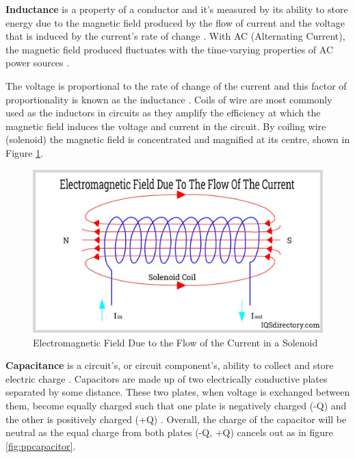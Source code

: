 \documentclass[12pt]{article}
\begin{document}
\textbf{Inductance} is a property of a conductor
\cite{britinductance}
and it's measured by its ability to store energy due to the magnetic field produced by the flow of current
\cite{elecnotes}
and the voltage that is induced by the current's rate of change
\cite{britinductance}.
With AC (Alternating Current), the magnetic field produced fluctuates with the time-varying properties of AC power sources
\cite{elecnotes,britinductance}.

The voltage is proportional to the rate of change of the current and this factor of proportionality is known as the inductance
\cite{britinductance}.
Coils of wire are most commonly used as the inductors in circuits as they amplify \cite{elecnotes} the efficiency at which the magnetic field induces
the voltage and current in the circuit. By coiling wire (solenoid) the magnetic field is concentrated and magnified at its centre, shown in Figure \ref{fig:solenoid}.

\begin{figure}[H]
    \includegraphics[width=12.5cm]{solenoid.jpg}
    \centering
    \caption{\centering \footnotesize{Electromagnetic Field Due to the Flow of the Current in a Solenoid \cite{solenoidpic}}}
    \label{fig:solenoid}
\end{figure}

\textbf{Capacitance} is a circuit's, or circuit component's, ability to collect and store electric charge
\cite{flukecapacitance}.
Capacitors are made up of two electrically conductive plates separated by some distance. These two plates, when voltage is exchanged between them,
become equally charged such that one plate is negatively charged (-Q) and the other is positively charged (+Q)
\cite{britcapacitance,librecapacitance}.
Overall, the charge of the capacitor will be neutral as the equal charge from both plates (-Q, +Q) cancels out
\cite{librecapacitance} as in figure \ref{fig:ppcapacitor}.
\end{document}
